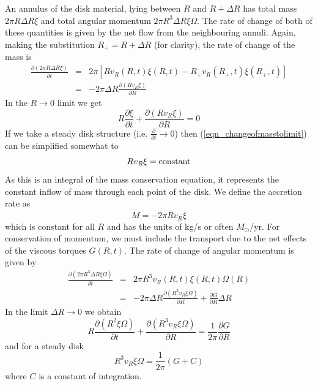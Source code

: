 An annulus of the disk material, lying between $R$ and $R+\Delta R$ has total mass $2 \pi R \Delta R \xi$ and total angular momentum
$2 \pi R^3 \Delta R \xi \Omega$. The rate of change of both of these quantities is given by the net flow from the neighbouring annuli.
Again, making the substitution $R_+ = R+\Delta R$ (for clarity), the rate of change of the mass is
\begin{eqnarray}
	\frac{\partial (2 \pi R \Delta R \xi)}{\partial t} &=& 2\pi \left[Rv_R(R,t)\xi(R,t)-R_+v_R(R_+,t)\xi(R_+,t)\right] \nonumber \\
	&=& -2\pi \Delta R\frac{\partial(Rv_R\xi)}{\partial R}
	\label{eqn_changeofmass}
\end{eqnarray}
In the $R\rightarrow 0$ limit we get
\begin{equation}
	R\frac{\partial \xi}{\partial t}+\frac{\partial (Rv_R\xi)}{\partial R} = 0
	\label{eqn_changeofmasstolimit}
\end{equation}
If we take a steady disk structure (i.e. $\frac{\partial}{\partial t}\rightarrow 0$) then (\ref{eqn_changeofmasstolimit}) can be simplified
somewhat to
\begin{equation}
	Rv_R\xi={\rm constant}
	\label{eqn_changeofmasstolimitsimplified}
\end{equation}
As this is an integral of the mass conservation equation, it represents the constant inflow of mass through each point of the disk. We define
the accretion rate as
\begin{equation}
	\dot M=-2\pi Rv_R\xi
	\label{eqn_accretionrate}
\end{equation}
which is constant for all $R$ and has the units of kg/s or often $M_\odot$/yr. For conservation of momentum, we must include the
transport due to the net effects of the viscous torques $G(R,t)$. The rate of change of angular momentum is given by
\begin{eqnarray}
	\frac{\partial (2 \pi R^3 \Delta R \xi \Omega)}{\partial t} &=& 2\pi R^3v_R(R,t)\xi(R,t)\Omega(R) \nonumber \\
	&=& -2\pi \Delta R \frac{\partial (R^3v_R\xi \Omega)}{\partial R} + \frac{\partial G}{\partial R} \Delta R
	\label{eqn_changeofmomentum}
\end{eqnarray}
In the limit $\Delta R \rightarrow 0$ we obtain
\begin{equation}
	R\frac{\partial (R^2\xi \Omega)}{\partial t} + \frac{\partial (R^3v_R\xi \Omega)}{\partial R} = \frac{1}{2\pi}\frac{\partial G}{\partial R}
	\label{eqn_changeofmomentumtolimit}
\end{equation}
and for a steady disk
\begin{equation}
	R^3v_R\xi \Omega = \frac{1}{2\pi}(G+C)
	\label{eqn_accretion4}
\end{equation}
where $C$ is a constant of integration.

